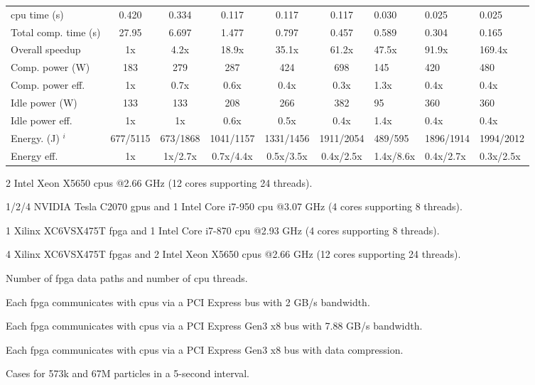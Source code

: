 \begin{table}[ht]
\begin{spacing}{1.0}
\begin{threeparttable}
\begin{tabular}{l || c c c c c g g g}
		\gls{cpu} time (s)							& 0.420							& 0.334						& 0.117						& 0.117						& 0.117						& 0.030		& 0.025		& 0.025		\\
		Total comp. time (s)  					& 27.95							& 6.697 					& 1.477						& 0.797						& 0.457						& 0.589 	& 0.304		& 0.165 	\\
		Overall speedup  						& 1x							& 4.2x	 					& 18.9x						& 35.1x						& 61.2x						& 47.5x 	& 91.9x		& 169.4x	\\
		\hline
		Comp. power (W) 	   					& 183							& 279 						& 287  						& 424						& 698						& 145 		& 420		& 480		\\
		Comp. power eff.						& 1x							& 0.7x						& 0.6x 						& 0.4x						& 0.3x						& 1.3x 		& 0.4x 		& 0.4x		\\
		Idle power (W)    						& 133							& 133						& 208   					& 266 						& 382						& 95		& 360		& 360		\\
		Idle power eff.					    	& 1x							& 1x						& 0.6x	 					& 0.5x						& 0.4x						& 1.4x 	& 0.4x		& 0.4x		\\
		\hline
		Energy. (J) $^i$						& 677/5115						& 673/1868 					& 1041/1157 				& 1331/1456					& 1911/2054					& 489/595 	& 1896/1914	& 1994/2012	\\
		Energy eff.								& 1x							& 1x/2.7x 					& 0.7x/4.4x 				& 0.5x/3.5x 				& 0.4x/2.5x					& 1.4x/8.6x	& 0.4x/2.7x	& 0.3x/2.5x\\
		\hline
		\end{tabular}
			\begin{tablenotes}
			\item[a] 2 Intel Xeon X5650 \gls{cpu}s @2.66 GHz (12 cores supporting 24 threads).
			\item[b] 1/2/4 NVIDIA Tesla C2070 \gls{gpu}s and 1 Intel Core i7-950 \gls{cpu} @3.07 GHz (4 cores supporting 8 threads).
			\item[c] 1 Xilinx XC6VSX475T \gls{fpga} and 1 Intel Core i7-870 \gls{cpu} @2.93 GHz (4 cores supporting 8 threads).
			\item[d] 4 Xilinx XC6VSX475T \gls{fpga}s and 2 Intel Xeon X5650 \gls{cpu}s @2.66 GHz (12 cores supporting 24 threads).
			\item[e] Number of \gls{fpga} data paths and number of \gls{cpu} threads.
			\item[f] Each \gls{fpga} communicates with \gls{cpu}s via a PCI Express bus with 2 GB/s bandwidth.
			\item[g] Each \gls{fpga} communicates with \gls{cpu}s via a PCI Express Gen3 x8 bus with 7.88 GB/s bandwidth.
			\item[h] Each \gls{fpga} communicates with \gls{cpu}s via a PCI Express Gen3 x8 bus with data compression.
			\item[i] Cases for 573k and 67M particles in a 5-second interval.
			\end{tablenotes}
		\end{threeparttable}
\end{spacing}
\end{table}

